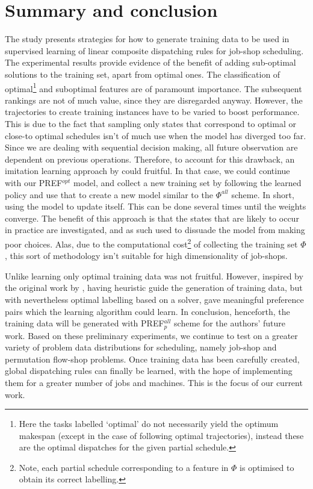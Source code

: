 \documentclass[smallextended]{llncs}
\newcommand{\PREF}[2]{PREF$_{#2}^{#1}$}
\begin{document}
\section{Summary and conclusion}\label{sec:summary}
The study presents strategies for how to generate training data to be used in supervised learning of linear composite dispatching rules for job-shop scheduling.
The experimental results provide evidence of the benefit of adding sub-optimal solutions to the training set, apart from optimal ones.
The classification of optimal\footnote{Here the tasks labelled `optimal' do not necessarily yield the optimum makespan (except in the case of following optimal trajectories), instead these are the optimal dispatches for the given partial schedule.} and suboptimal features are of paramount importance. The subsequent rankings are not of much value, since they are disregarded anyway. 
However, the trajectories to create training instances have to be varied to boost performance. This is due to the  fact that sampling only states that  correspond  to optimal or close-to optimal schedules isn't of much use when the model has diverged too far. Since we are dealing with sequential decision making, all future observation are dependent on previous operations. 
Therefore, to account for this drawback, an imitation learning approach  by \cite{RossB10,RossGB11} could fruitful. 
In that case, we could continue with our \PREF{opt}{} model, and collect a new training set by following the learned policy and use that to create a new model similar to the $\Phi^{all}$ scheme. In short, using the model to update itself. 
This can be done several times until the weights converge. The benefit of this approach is that the states that are likely to occur in practice are investigated, and as such used to dissuade the model from making poor choices. Alas, due to the computational cost\footnote{Note, each partial schedule corresponding to a feature in $\Phi$ is optimised to obtain its correct labelling.} of collecting the training set $\Phi$, this sort of methodology isn't suitable for high dimensionality of job-shops. 

Unlike \cite{Siggi10,Malik08,Russell09} learning only optimal training data was not fruitful. However, inspired by the original work by \cite{Siggi05}, having heuristic guide the generation of training data, but with nevertheless optimal labelling based on a solver, gave meaningful preference pairs which the learning algorithm could learn. In conclusion, henceforth, the training data will be generated with \PREF{all}{p} scheme for the authors' future work.
Based on these preliminary experiments, we continue to test on a greater variety of problem data distributions for scheduling, namely job-shop and permutation flow-shop problems. Once training data has been carefully created, global dispatching rules can finally be learned, with the hope of implementing them for a greater number of jobs and machines. This is the focus of our current work.
 
 
 

 
\end{document}
